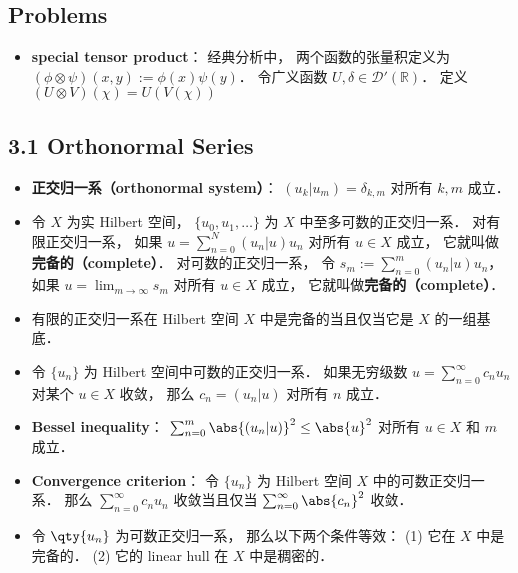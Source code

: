 \subsection{Problems}
\begin{itemize}
\item \textbf{special tensor product}： 经典分析中， 两个函数的张量积定义为 $(\phi\otimes\psi)(x,y) := \phi(x)\psi(y)$． 令广义函数 $U, \delta \in \mathcal D'(\mathbb R)$． 定义 $(U\otimes V)(\chi) = U(V(\chi))$
\end{itemize}

\subsection{3.1 Orthonormal Series}
\begin{itemize}
\item \textbf{正交归一系（orthonormal system）}： $(u_k|u_m) = \delta_{k,m}$ 对所有 $k, m$ 成立．

\item 令 $X$ 为实 Hilbert 空间， $\{u_0, u_1,\dots\}$ 为 $X$ 中至多可数的正交归一系． 对有限正交归一系， 如果 $u = \sum_{n=0}^N(u_n|u)u_n$ 对所有 $u\in X$ 成立， 它就叫做\textbf{完备的（complete）}． 对可数的正交归一系， 令 $s_m := \sum_{n=0}^m(u_n|u)u_n$， 如果 $u = \lim_{m\to\infty} s_m$ 对所有 $u\in X$ 成立， 它就叫做\textbf{完备的（complete）}．

\item 有限的正交归一系在 Hilbert 空间 $X$ 中是完备的当且仅当它是 $X$ 的一组基底．

\item 令 $\{u_n\}$ 为 Hilbert 空间中可数的正交归一系． 如果无穷级数 $u = \sum_{n=0}^\infty c_n u_n$ 对某个 $u\in X$ 收敛， 那么 $c_n = (u_n|u)$ 对所有 $n$ 成立．

\item \textbf{Bessel inequality}： $\sum_{n=0}^m \abs{(u_n|u)}^2 \le \abs{u}^2$ 对所有 $u \in X$ 和 $m$ 成立．

\item \textbf{Convergence criterion}： 令 $\{u_n\}$ 为 Hilbert 空间 $X$ 中的可数正交归一系． 那么 $\sum_{n=0}^\infty c_nu_n$ 收敛当且仅当 $\sum_{n=0}^\infty \abs{c_n}^2$ 收敛．

\item 令 $\qty{u_n}$ 为可数正交归一系， 那么以下两个条件等效： (1) 它在 $X$ 中是完备的． (2) 它的 linear hull 在 $X$ 中是稠密的．
\end{itemize}


